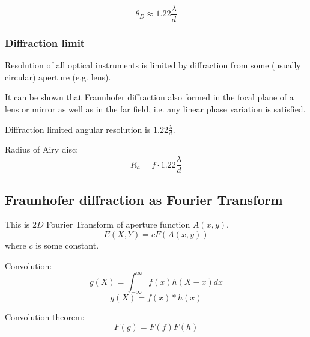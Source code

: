 \documentclass[10pt]{article}
\begin{document}
\begin{equation}\boxed{
\theta_D \approx 1.22\frac{\lambda}{d}
}\end{equation}

\subsubsection*{Diffraction limit}
Resolution of all optical instruments is limited by diffraction from some (usually circular) aperture (e.g. lens).

It can be shown that Fraunhofer diffraction also formed in the focal plane of a lens or mirror as well as in the far field, i.e. any linear phase variation is satisfied.

Diffraction limited angular resolution is $1.22\frac{\lambda}{d}$.

Radius of Airy disc:
\begin{equation}\boxed{
R_a = f \cdot 1.22\frac{\lambda}{d}
}\end{equation}

\subsection{Fraunhofer diffraction as Fourier Transform}
This is $2D$ Fourier Transform of aperture function $A(x,y)$.
\begin{equation*}
E(X,Y) = c F(A(x,y))
\end{equation*}
where $c$ is some constant.

Convolution:
\begin{equation}\boxed{
g(X) = \int_{-\infty} ^{\infty} f(x)h(X - x)dx
}\end{equation}
\begin{equation}\boxed{
g(X) = f(x) \ast h(x)
}\end{equation}

Convolution theorem:
\begin{equation}\boxed{
F(g) = F(f)F(h)
}\end{equation}
\end{document}
